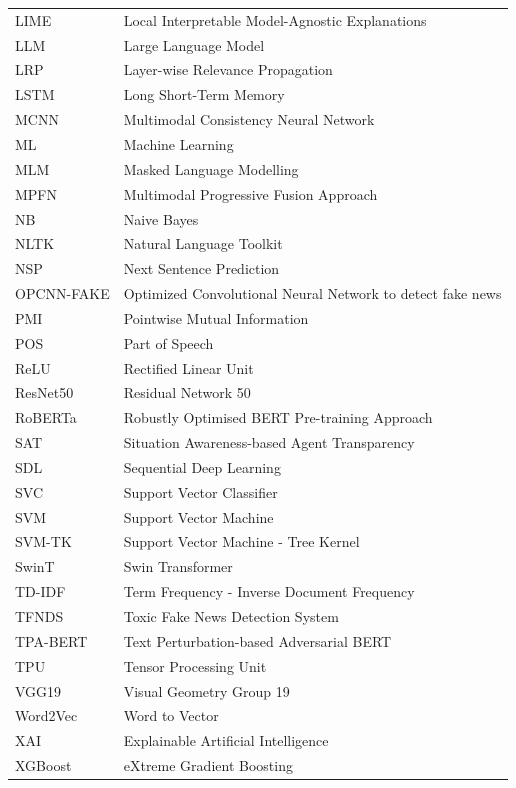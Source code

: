 \documentclass[stu,12pt,floatsintext,donotrepeattitle]{apa7}
\begin{document}
\begin{longtable}{p{3cm} p{10cm}}
LIME & Local Interpretable Model-Agnostic Explanations \\
LLM & Large Language Model \\
LRP & Layer-wise Relevance Propagation \\
LSTM & Long Short-Term Memory \\
MCNN & Multimodal Consistency Neural Network \\
ML & Machine Learning \\
MLM & Masked Language Modelling \\
MPFN & Multimodal Progressive Fusion Approach \\
NB & Naive Bayes \\
NLTK & Natural Language Toolkit \\
NSP & Next Sentence Prediction \\
OPCNN-FAKE & Optimized Convolutional Neural Network to detect fake news \\
PMI & Pointwise Mutual Information \\
POS & Part of Speech \\
ReLU & Rectified Linear Unit \\
ResNet50 & Residual Network 50 \\
RoBERTa & Robustly Optimised BERT Pre-training Approach \\
SAT & Situation Awareness-based Agent Transparency \\
SDL & Sequential Deep Learning \\
SVC & Support Vector Classifier \\
SVM & Support Vector Machine \\
SVM-TK & Support Vector Machine - Tree Kernel \\
SwinT & Swin Transformer \\
TD-IDF & Term Frequency - Inverse Document Frequency \\
TFNDS & Toxic Fake News Detection System \\
TPA-BERT & Text Perturbation-based Adversarial BERT \\
TPU & Tensor Processing Unit \\
VGG19 & Visual Geometry Group 19 \\
Word2Vec & Word to Vector \\
XAI & Explainable Artificial Intelligence \\
XGBoost & eXtreme Gradient Boosting \\
\end{longtable}

\clearpage
\begingroup
\titlespacing*{\section}{0pt}{0pt}{6pt}
\end{document}
